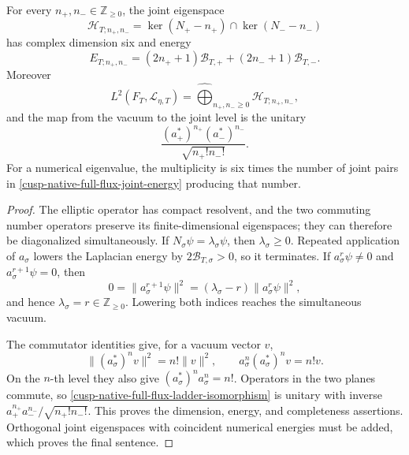 \begin{theorem}
\label{cusp-native-full-flux-landau-theorem}
For every \(n_+,n_-\in\mathbb Z_{\ge0}\), the joint eigenspace
\begin{equation}
 \mathcal H_{T;n_+,n_-}
 =\ker(N_+-n_+)\cap\ker(N_--n_-)
 \label{cusp-native-full-flux-joint-space}
\end{equation}
has complex dimension six and energy
\begin{equation}
 E_{T;n_+,n_-}
 =(2n_++1)\mathcal B_{T,+}
 +(2n_-+1)\mathcal B_{T,-}.
 \label{cusp-native-full-flux-joint-energy}
\end{equation}
Moreover
\begin{equation}
 L^2(F_T,\mathscr L_{\eta,T})
 =\widehat{\bigoplus}_{n_+,n_-\ge0}\mathcal H_{T;n_+,n_-},
 \label{cusp-native-full-flux-complete-decomposition}
\end{equation}
and the map from the vacuum to the joint level is the unitary
\begin{equation}
 \frac{(a_+^*)^{n_+}(a_-^*)^{n_-}}{\sqrt{n_+!n_-!}}.
 \label{cusp-native-full-flux-ladder-isomorphism}
\end{equation}
For a numerical eigenvalue, the multiplicity is six times the number of
joint pairs in \cref{cusp-native-full-flux-joint-energy} producing that
number.
\end{theorem}

\begin{proof}
The elliptic operator has compact resolvent, and the two commuting number
operators preserve its finite-dimensional eigenspaces; they can therefore be
diagonalized simultaneously.  If \(N_\sigma\psi=\lambda_\sigma\psi\), then
\(\lambda_\sigma\ge0\).  Repeated application of \(a_\sigma\) lowers the
Laplacian energy by \(2\mathcal B_{T,\sigma}>0\), so it terminates.  If
\(a_\sigma^r\psi\ne0\) and \(a_\sigma^{r+1}\psi=0\), then
\[
 0=\|a_\sigma^{r+1}\psi\|^2
  =(\lambda_\sigma-r)\|a_\sigma^r\psi\|^2,
\]
and hence \(\lambda_\sigma=r\in\mathbb Z_{\ge0}\).  Lowering both indices
reaches the simultaneous vacuum.

The commutator identities give, for a vacuum vector \(v\),
\[
 \|(a_\sigma^*)^nv\|^2=n!\|v\|^2,
 \qquad a_\sigma^n(a_\sigma^*)^nv=n!v.
\]
On the \(n\)-th level they also give
\((a_\sigma^*)^na_\sigma^n=n!\).  Operators in the two planes commute, so
\cref{cusp-native-full-flux-ladder-isomorphism} is unitary with inverse
\(a_+^{n_+}a_-^{n_-}/\sqrt{n_+!n_-!}\).  This proves the dimension, energy,
and completeness assertions.  Orthogonal joint eigenspaces with coincident
numerical energies must be added, which proves the final sentence.
\end{proof}

